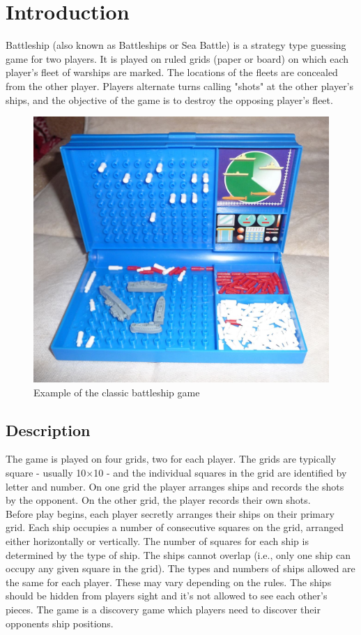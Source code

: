 \newpage
\section{Introduction}
\qquad Battleship (also known as Battleships or Sea Battle) is a strategy type guessing game for two players. It is played on ruled grids (paper or board) on which each player's fleet of warships are marked. The locations of the fleets are concealed from the other player. Players alternate turns calling "shots" at the other player's ships, and the objective of the game is to destroy the opposing player's fleet. \\[6pt]

\begin{figure}[H]
    \centering
    \includegraphics[width=12cm]{graphics/battleship.jpg}
    \caption{Example of the classic battleship game}
\end{figure}

\subsection{Description}
\qquad The game is played on four grids, two for each player. The grids are typically square - usually 10$\times$10 - and the individual squares in the grid are identified by letter and number. On one grid the player arranges ships and records the shots by the opponent. On the other grid, the player records their own shots.\\

\qquad Before play begins, each player secretly arranges their ships on their primary grid. Each ship occupies a number of consecutive squares on the grid, arranged either horizontally or vertically. The number of squares for each ship is determined by the type of ship. The ships cannot overlap (i.e., only one ship can occupy any given square in the grid). The types and numbers of ships allowed are the same for each player. These may vary depending on the rules. The ships should be hidden from players sight and it's not allowed to see each other's pieces. The game is a discovery game which players need to discover their opponents ship positions.\\

